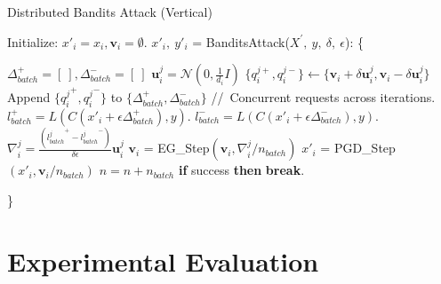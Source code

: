 \begin{minipage}{0.9\textwidth}
\begin{algorithm}[H]
    \centering
    \caption{Distributed Bandits Attack (Vertical)}
    \label{alg:bandits_vertical}
    \begin{algorithmic}
            \STATE Initialize: $x'_i = x_i, \boldsymbol{v}_i =\emptyset$.
            \STATE $x'_i,\ y'_{i}$ = BanditsAttack($X^{'},\ y,\ \delta,\ \epsilon$):
            \STATE \{
            \begin{ALC@g}
                \FOR {each iteration $n \in [0,\ n_{iter})$}
                    \STATE $\Delta^+_{batch} = [\ ], \Delta^-_{batch} = [\ ]$
                            \STATE $\boldsymbol{u}_i^j = \mathcal{N}(0, \frac{1}{d_i}I)$
                            \STATE $\{q_{i}^{j+}, q_{i}^{j-}\} \leftarrow \{\boldsymbol{v}_i + \delta \boldsymbol{u}_i^j, {\boldsymbol{v}_i - \delta \boldsymbol{u}_i^j}\}$
                            \STATE Append $\{{q_{i}^{j}}^+, {q_{i}^{j}}^-\}$ to $\{\Delta_{batch}^+, \Delta_{batch}^-\}$ 
                    \ENDFOR
                    \STATE //\ Concurrent requests across iterations.
                    \STATE $l^+_{batch} = L(C(x{'}_i + \epsilon\Delta_{batch}^+), y)$.
                    \STATE $l^-_{batch} = L(C(x{'}_i + \epsilon\Delta_{batch}^-), y)$.
                        \STATE $\nabla_i^j = \frac{({l^j_{batch}}^+ - {l^j_{batch}}^-)}{\delta\epsilon} \boldsymbol{u}_i^j$
                        \STATE $\boldsymbol{v}_i$ = EG\_Step$(\boldsymbol{v}_i, \nabla_i^j / n_{batch})$
                        \STATE $x'_i$ = PGD\_Step$(x'_i, \boldsymbol{v}_i / n_{batch})$
                    \ENDFOR
                    \STATE $n = n + n_{batch}$
                    \STATE \textbf{if} {success} \textbf{then} {\textbf{break}}.
                \ENDFOR
            \end{ALC@g}
            \STATE \}
        \ENDFOR
    \end{algorithmic}
\end{algorithm}
\end{minipage}

\clearpage

\section{Experimental Evaluation}
\label{section_experimental_evaluation}

